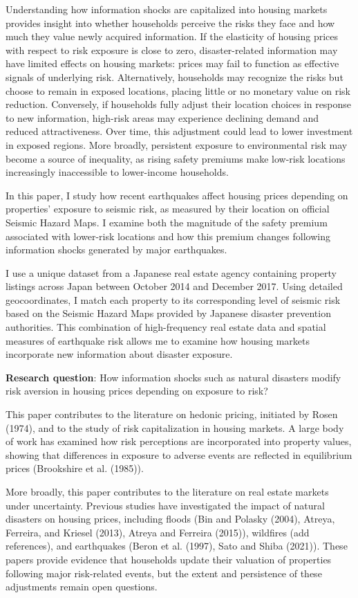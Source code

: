 \documentclass[
  letterpaper,
  DIV=11,
  numbers=noendperiod]{scrartcl}
\begin{document}
Understanding how information shocks are capitalized into housing
markets provides insight into whether households perceive the risks they
face and how much they value newly acquired information. If the
elasticity of housing prices with respect to risk exposure is close to
zero, disaster-related information may have limited effects on housing
markets: prices may fail to function as effective signals of underlying
risk. Alternatively, households may recognize the risks but choose to
remain in exposed locations, placing little or no monetary value on risk
reduction. Conversely, if households fully adjust their location choices
in response to new information, high-risk areas may experience declining
demand and reduced attractiveness. Over time, this adjustment could lead
to lower investment in exposed regions. More broadly, persistent
exposure to environmental risk may become a source of inequality, as
rising safety premiums make low-risk locations increasingly inaccessible
to lower-income households.

In this paper, I study how recent earthquakes affect housing prices
depending on properties' exposure to seismic risk, as measured by their
location on official Seismic Hazard Maps. I examine both the magnitude
of the safety premium associated with lower-risk locations and how this
premium changes following information shocks generated by major
earthquakes.

I use a unique dataset from a Japanese real estate agency containing
property listings across Japan between October 2014 and December 2017.
Using detailed geocoordinates, I match each property to its
corresponding level of seismic risk based on the Seismic Hazard Maps
provided by Japanese disaster prevention authorities. This combination
of high-frequency real estate data and spatial measures of earthquake
risk allows me to examine how housing markets incorporate new
information about disaster exposure.

\textbf{Research question}: How information shocks such as natural
disasters modify risk aversion in housing prices depending on exposure
to risk?

This paper contributes to the literature on hedonic pricing, initiated
by Rosen (1974), and to the study of risk capitalization in housing
markets. A large body of work has examined how risk perceptions are
incorporated into property values, showing that differences in exposure
to adverse events are reflected in equilibrium prices (Brookshire et al.
(1985)).

More broadly, this paper contributes to the literature on real estate
markets under uncertainty. Previous studies have investigated the impact
of natural disasters on housing prices, including floods (Bin and
Polasky (2004), Atreya, Ferreira, and Kriesel (2013), Atreya and
Ferreira (2015)), wildfires (add references), and earthquakes (Beron et
al. (1997), Sato and Shiba (2021)). These papers provide evidence that
households update their valuation of properties following major
risk-related events, but the extent and persistence of these adjustments
remain open questions.
\end{document}
